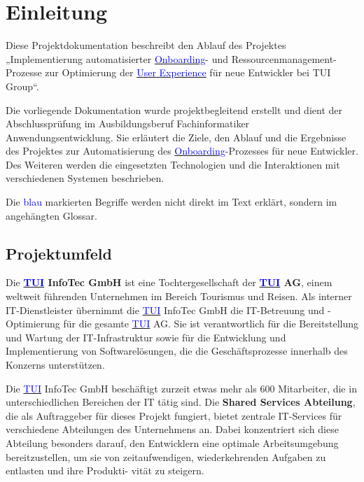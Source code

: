 \section{Einleitung}
\label{sec:Einleitung}

Diese Projektdokumentation beschreibt den Ablauf des Projektes „Implementierung automatisierter \hyperlink{Onboarding}{\textcolor{blue}{Onboarding}}- und Ressourcenmanagement-Prozesse zur Optimierung der \hyperlink{UserExperience}{\textcolor{blue}{User Experience}} für neue Entwickler bei \ac{TUI} Group“. 

Die vorliegende Dokumentation wurde projektbegleitend erstellt und dient der Abschlussprüfung im Ausbildungsberuf Fachinformatiker Anwendungsentwicklung. Sie erläutert die Ziele, den Ablauf und die Ergebnisse des Projektes zur Automatisierung des \hyperlink{Onboarding}{\textcolor{blue}{Onboarding}}-Prozesses für neue Entwickler. Des Weiteren werden die eingesetzten Technologien und die Interaktionen mit verschiedenen Systemen beschrieben. 

Die \textcolor{blue}{blau} markierten Begriffe werden nicht direkt im Text erklärt, sondern im angehängten Glossar.

\subsection{Projektumfeld} 
\label{sec:Projektumfeld}

Die \textbf{\hyperlink{TUI}{\textcolor{blue}{TUI}} InfoTec GmbH} ist eine Tochtergesellschaft der \textbf{\hyperlink{TUI}{\textcolor{blue}{TUI}} AG}, einem weltweit führenden Unternehmen im Bereich Tourismus und Reisen. Als interner IT-Dienstleister übernimmt die \hyperlink{TUI}{\textcolor{blue}{TUI}} InfoTec GmbH die IT-Betreuung und -Optimierung für die gesamte \hyperlink{TUI}{\textcolor{blue}{TUI}} AG. Sie ist verantwortlich für die Bereitstellung und Wartung der IT-Infrastruktur sowie für die Entwicklung und Implementierung von Softwarelösungen, die die Geschäftsprozesse innerhalb des Konzerns unterstützen.

Die \hyperlink{TUI}{\textcolor{blue}{TUI}} InfoTec GmbH beschäftigt zurzeit etwas mehr
als 600 Mitarbeiter, die in unterschiedlichen Bereichen der IT tätig sind.
Die \textbf{Shared Services Abteilung}, die als Auftraggeber für dieses Projekt fungiert, 
bietet zentrale IT-Services für verschiedene Abteilungen des Unternehmens an.
Dabei konzentriert sich diese Abteilung besonders darauf, den Entwicklern eine
optimale Arbeitsumgebung bereitzustellen, um sie von zeitaufwendigen, wiederkehrenden
Aufgaben zu entlasten und ihre Produkti-
vität zu steigern.

